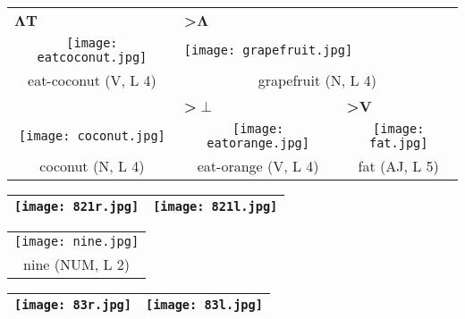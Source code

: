 \documentclass{tufte-book}
\newcommand{\sansnormal}{\sffamily\selectfont}
\begin{document}
\begin{fullwidth}
\begin{table*}[h!]
\begin{tabular}{ccc}
\multicolumn{1}{l}{$\mathbf\Lambda${\sansnormal\textbf{T}}}&\multicolumn{1}{l}{\textbf{>}$\mathbf\Lambda$}&  \\
\texttt{[image: eatcoconut.jpg]}&\multicolumn{2}{l}{\texttt{[image: grapefruit.jpg]}}\\
   eat-coconut (V, L 4)&\multicolumn{2}{c}{grapefruit (N, L 4)}\\
  & \multicolumn{1}{l}{\textbf{>}$\pmb\perp$}&\multicolumn{1}{l}{\textbf{>}{\sansnormal\textbf{V}}} \\
  \texttt{[image: coconut.jpg]}&\texttt{[image: eatorange.jpg]}&\texttt{[image: fat.jpg]}\\
  coconut (N, L 4) & eat-orange (V, L 4)& fat (AJ, L 5)\\
  
   
   
  \end{tabular}
\end{table*} 

     \begin{table}[h!]
\begin{tabular}{|c|c|}
\hline
\texttt{[image: 821r.jpg]} & \texttt{[image: 821l.jpg]}\\
\hline
\end{tabular}
\label{page:821}
\end{table}

 \begin{table*}[h!]
\begin{tabular}{c}
   \texttt{[image: nine.jpg]}\\
   nine (NUM, L 2)\\%
  
  \end{tabular}
\end{table*}
\newpage

  \begin{table}[h!]
\begin{tabular}{|c|c|}
\hline
\texttt{[image: 83r.jpg]} & \texttt{[image: 83l.jpg]}\\
\hline
\end{tabular}
\label{page:83}
\end{table}


\end{fullwidth}
\end{document}
